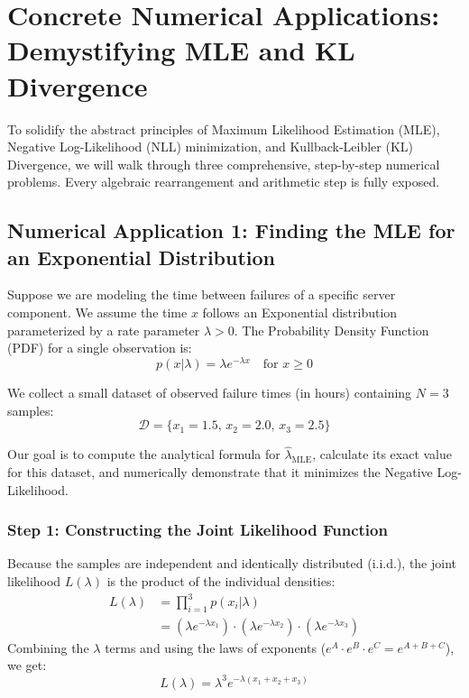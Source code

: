 \documentclass{article}
\begin{document}
\section{Concrete Numerical Applications: Demystifying MLE and KL Divergence}

To solidify the abstract principles of Maximum Likelihood Estimation (MLE), Negative Log-Likelihood (NLL) minimization, and Kullback-Leibler (KL) Divergence, we will walk through three comprehensive, step-by-step numerical problems. Every algebraic rearrangement and arithmetic step is fully exposed.

\subsection{Numerical Application 1: Finding the MLE for an Exponential Distribution}

Suppose we are modeling the time between failures of a specific server component. We assume the time $x$ follows an Exponential distribution parameterized by a rate parameter $\lambda > 0$. The Probability Density Function (PDF) for a single observation is:
\begin{equation}
p(x|\lambda) = \lambda e^{-\lambda x} \quad \text{for } x \ge 0
\end{equation}

We collect a small dataset of observed failure times (in hours) containing $N = 3$ samples:
\begin{equation}
\mathcal{D} = \{x_1 = 1.5, \, x_2 = 2.0, \, x_3 = 2.5\}
\end{equation}

Our goal is to compute the analytical formula for $\hat{\lambda}_{\text{MLE}}$, calculate its exact value for this dataset, and numerically demonstrate that it minimizes the Negative Log-Likelihood.

\subsubsection{Step 1: Constructing the Joint Likelihood Function}
Because the samples are independent and identically distributed (i.i.d.), the joint likelihood $L(\lambda)$ is the product of the individual densities:
\begin{align*}
L(\lambda) &= \prod_{i=1}^{3} p(x_i|\lambda) \\
&= (\lambda e^{-\lambda x_1}) \cdot (\lambda e^{-\lambda x_2}) \cdot (\lambda e^{-\lambda x_3})
\end{align*}
Combining the $\lambda$ terms and using the laws of exponents ($e^A \cdot e^B \cdot e^C = e^{A+B+C}$), we get:
\begin{equation}
L(\lambda) = \lambda^3 e^{-\lambda (x_1 + x_2 + x_3)}
\end{equation}
\end{document}
